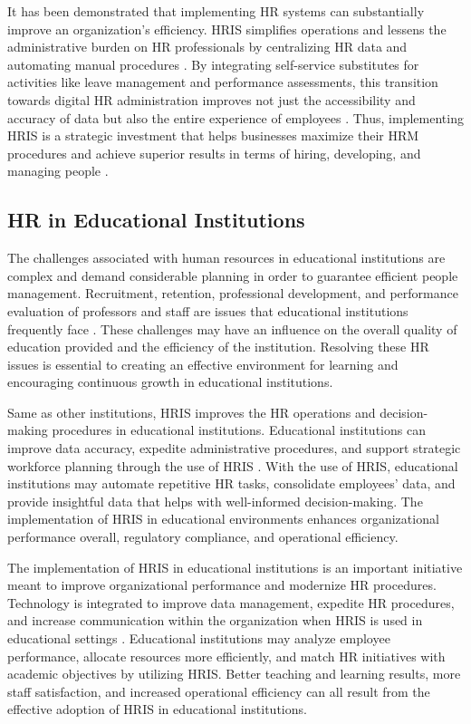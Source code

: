         It has been demonstrated that implementing HR systems can substantially improve an organization's efficiency. HRIS simplifies operations and lessens the administrative burden on HR professionals by centralizing HR data and automating manual procedures \cite{arc12020}. By integrating self-service substitutes for activities like leave management and performance assessments, this transition towards digital HR administration improves not just the accessibility and accuracy of data but also the entire experience of employees \cite{f12022}. Thus, implementing HRIS is a strategic investment that helps businesses maximize their HRM procedures and achieve superior results in terms of hiring, developing, and managing people \cite{aab12019}.
        

    \subsection{HR in Educational Institutions}
        The challenges associated with human resources in educational institutions are complex and demand considerable planning in order to guarantee efficient people management. Recruitment, retention, professional development, and performance evaluation of professors and staff are issues that educational institutions frequently face \cite{f12023}. These challenges may have an influence on the overall quality of education provided and the efficiency of the institution. Resolving these HR issues is essential to creating an effective environment for learning and encouraging continuous growth in educational institutions.
        
    	Same as other institutions, HRIS improves the HR operations and decision-making procedures in educational institutions. Educational institutions can improve data accuracy, expedite administrative procedures, and support strategic workforce planning through the use of HRIS \cite{edcpr12019}. With the use of HRIS, educational institutions may automate repetitive HR tasks, consolidate employees' data, and provide insightful data that helps with well-informed decision-making. The implementation of HRIS in educational environments enhances organizational performance overall, regulatory compliance, and operational efficiency.

    	The implementation of HRIS in educational institutions is an important initiative meant to improve organizational performance and modernize HR procedures. Technology is integrated to improve data management, expedite HR procedures, and increase communication within the organization when HRIS is used in educational settings \cite{s12020}. Educational institutions may analyze employee performance, allocate resources more efficiently, and match HR initiatives with academic objectives by utilizing HRIS. Better teaching and learning results, more staff satisfaction, and increased operational efficiency can all result from the effective adoption of HRIS in educational institutions.

